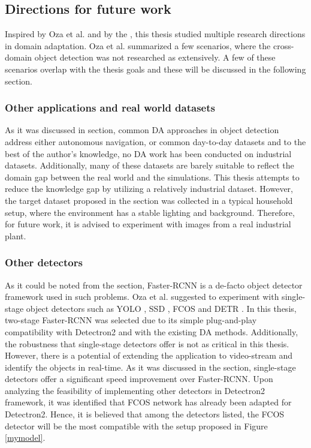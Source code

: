 \subsection{Directions for future work}
Inspired by Oza et al. \cite{Oza2021} and by the , this thesis studied multiple research directions in domain adaptation. Oza et al. summarized a few scenarios, where the cross-domain object detection was not researched as extensively. A few of these scenarios overlap with the thesis goals and these will be discussed in the following section. 

\subsubsection{Other applications and real world datasets}
As it was discussed in  section, common DA approaches in object detection address either autonomous navigation, or common day-to-day datasets and to the best of the author's knowledge, no DA work has been conducted on  industrial datasets. Additionally, many of these datasets are barely suitable to reflect the domain gap between the real world and the simulations. This thesis attempts to reduce the knowledge gap by utilizing a relatively industrial dataset. However, the target dataset proposed in the  section was collected in a typical household setup, where the environment has a stable lighting and background. Therefore, for future work, it is advised to experiment with images from a real industrial plant.  

\subsubsection{Other detectors}
As it could be noted from the  section, Faster-RCNN is a de-facto object detector framework used in such problems. Oza et al. \cite{Oza2021} suggested to experiment with single-stage object detectors such as YOLO \cite{Redmon2015a}, SSD \cite{Liu2015}, FCOS \cite{Tian2019} and DETR \cite{Carion2020}. In this thesis, two-stage Faster-RCNN was selected due to its simple plug-and-play compatibility with Detectron2 \cite{wu2019Detectron2} and with the existing DA methods. Additionally, the robustness that single-stage detectors offer is not as critical in this thesis. However, there is a potential of extending the application to video-stream and identify the objects in real-time. As it was discussed in the  section, single-stage detectors offer a significant speed improvement over Faster-RCNN. Upon analyzing the feasibility of implementing other detectors in Detectron2 \cite{wu2019Detectron2} framework, it was identified that FCOS network has already been adapted for Detectron2. Hence, it is believed that among the detectors listed, the FCOS detector will be the most compatible with the setup proposed in Figure \ref{mymodel}. 


